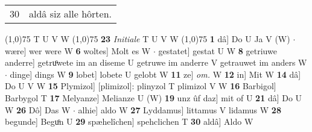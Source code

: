 \documentclass[8pt,a4paper,notitlepage]{article}
\begin{document}
\begin{table}[ht]
\begin{minipage}[t]{0.5\linewidth}
\begin{tabular}{rl}
30 & aldâ siz alle hôrten.\\ 
\end{tabular}
\scriptsize
\line(1,0){75} \newline
T U V W \newline
\line(1,0){75} \newline
\textbf{23} \textit{Initiale} T U V W  \newline
\line(1,0){75} \newline
\textbf{1} dâ] Do U Ja V (W)  $\cdot$ wære] wer were W \textbf{6} woltes] Molt es W  $\cdot$ gestatet] gestat U W \textbf{8} getriuwe anderre] getruͦwete im an diseme U getruwe im anderre V getrauwet im anders W  $\cdot$ dinge] dings W \textbf{9} lobet] lobete U gelobt W \textbf{11} ze] \textit{om.} W \textbf{12} in] Mit W \textbf{14} dâ] Do U V W \textbf{15} Plymizol] [plimizol]: plinyzol T plimizol V W \textbf{16} Barbigol] Barbygol T \textbf{17} Melyanze] Melianze U (W) \textbf{19} unz ûf daz] mit of U \textbf{21} dâ] Do U W \textbf{26} Dô] Das W  $\cdot$ alhie] aldo W \textbf{27} Lyddamus] littamus V lidamus W \textbf{28} begunde] Beguͦn U \textbf{29} spæhelîchen] spehclichen T \textbf{30} aldâ] Aldo W \newline
\end{minipage}
\end{table}
\end{document}
